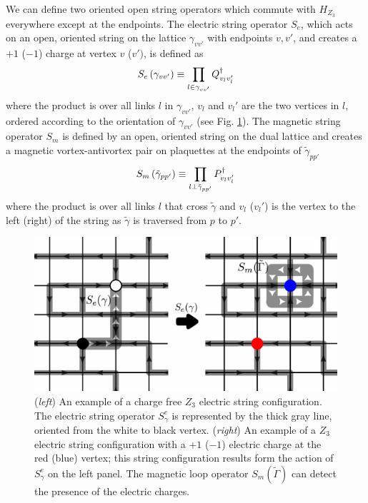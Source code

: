\documentclass[twocolumn,prb,aps,floatfix,superscriptaddress]{revtex4-1}
\newcommand{\figref}[1]{Fig. \ref{#1}}
\begin{document}
We can define two oriented open string operators which commute with $H_{Z_3}$ everywhere except at the endpoints. The electric string operator $S_e$, which acts on an open, oriented string on the lattice $\gamma_{vv'}$ with endpoints $v,v'$, and creates a $+1$ ($-1$) charge at vertex $v$ ($v')$, is defined as
\begin{equation}
    S_e \left( \gamma_{vv'} \right) \equiv \prod_{l \in \gamma_{vv'}} Q_{v_l v_l'}^\dagger  \notag
\end{equation}
where the product is over all links $l$ in $\gamma_{vv'}$, $v_l$ and $v_l'$ are the two vertices in $l$, ordered according to the orientation of $\gamma_{vv'}$ (see \figref{fig:example_elec_string}). The magnetic string operator $S_m$ is defined by an open, oriented string on the dual lattice and creates a magnetic vortex-antivortex pair on plaquettes at the endpoints of $\tilde{\gamma}_{pp'}$
\begin{equation}
    S_m \left( \tilde{\gamma}_{pp'} \right) \equiv \prod_{l \perp \tilde{\gamma}_{pp'}} P_{v_l v_l'}^\dagger  \notag
\end{equation}
where the product is over all links $l$ that cross $\tilde{\gamma}$ and $v_l$ ($v_l'$) is the vertex to the left (right) of the string as $\tilde{\gamma}$ is traversed from $p$ to $p'$. 
\begin{figure}[t]
    \centering
    \includegraphics[width=1.0\linewidth]{example_elec_string.pdf}
    \caption{ ({\it left}) An example of a charge free $Z_3$ electric string configuration. The electric string operator $S_\gamma^e$ is represented by the thick gray line, oriented from the white to black vertex. ({\it right}) An example of a $Z_3$ electric string configuration with a $+1$ ($-1$) electric charge at the red (blue) vertex; this string configuration results form the action of $S_\gamma^e$ on the left panel. The magnetic loop operator $S_m (\tilde{\Gamma})$ can detect the presence of the electric charges.  }
    \label{fig:example_elec_string}
\end{figure}
\end{document}
